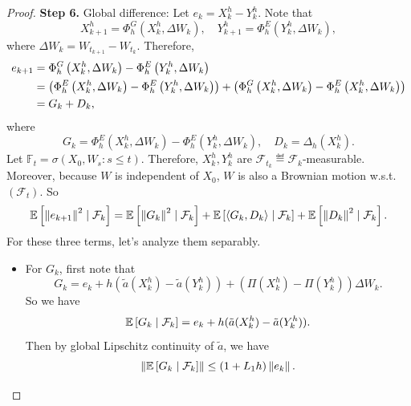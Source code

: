\begin{proof}
    \vspace{0.5em}
    \textbf{Step 6.} Global difference: Let $e_k = X^h_k - Y^h_k$. Note that
    \begin{equation*}
        X_{k+1}^h=\Phi_h^G\left(X_k^h, \Delta W_k\right), \quad Y_{k+1}^h=\Phi_h^E\left(Y_k^h, \Delta W_k\right),
    \end{equation*}
    where $\Delta W_k = W_{t_{k+1}} - W_{t_k}$. Therefore,
    \begin{align*}
        e_{k+1} &= \Phi_h^G\left(X_k^h, \Delta W_k\right) - \Phi_h^E\left(Y_k^h, \Delta W_k\right) \\
        &= \left(\Phi_h^E\left(X_k^h, \Delta W_k\right) - \Phi_h^E\left(Y_k^h, \Delta W_k\right)\right) + \left(\Phi_h^G\left(X_k^h, \Delta W_k\right) - \Phi_h^E\left(X_k^h, \Delta W_k\right)\right) \\
        &= G_k + D_k,
    \end{align*}
    where
    \begin{equation*}
        G_k = \Phi_h^E\left(X_k^h, \Delta W_k\right) - \Phi_h^E\left(Y_k^h, \Delta W_k\right),\quad D_k = \Delta_h(X_k^h).
    \end{equation*}
    Let $\mathbb{F}_t = \sigma(X_0,W_s \colon s\leq t)$. Therefore, $X^h_k,Y^h_k$ are $\mathcal{F}_{t_k} \eqdef \mathcal{F}_k$-measurable. Moreover, because $W$ is independent of $X_0$, $W$ is also a Brownian motion w.s.t. $(\mathcal{F}_t)$. So
    \begin{equation*}
        \mathbb{E}\left[\left\lVert e_{k+1}\right\lVert^2 \mid \mathcal{F}_k\right] = \mathbb{E}\left[\left\lVert G_k\right\lVert^2 \mid \mathcal{F}_k\right] + \mathbb{E}\left[ \left\langle G_k,D_k \right\rangle \mid \mathcal{F}_k\right] + \mathbb{E}\left[\left\lVert D_k\right\lVert^2 \mid \mathcal{F}_k\right].
    \end{equation*}
    For these three terms, let's analyze them separably.
    \begin{itemize}
        \item For $G_k$, first note that
        \begin{equation*}
            G_k = e_k + h(\tilde{a}(X^h_k) - \tilde{a}(Y^h_k)) + (\Pi(X^h_k) - \Pi(Y^h_k))\Delta W_k.
        \end{equation*}
        So we have
        \begin{equation*}
            \mathbb{E}\left[G_k \mid \mathcal{F}_k\right] = e_k + h(\tilde{a}(X^h_k) - \tilde{a}(Y^h_k)).
        \end{equation*}
        Then by global Lipschitz continuity of $\tilde{a}$, we have
        \begin{equation*}
            \norm{\E\bj{G_k \mid \mathcal{F}_k}} \leq (1 + L_1h)\norm{e_k}.

\end{equation*}
\end{itemize}
\end{proof}
